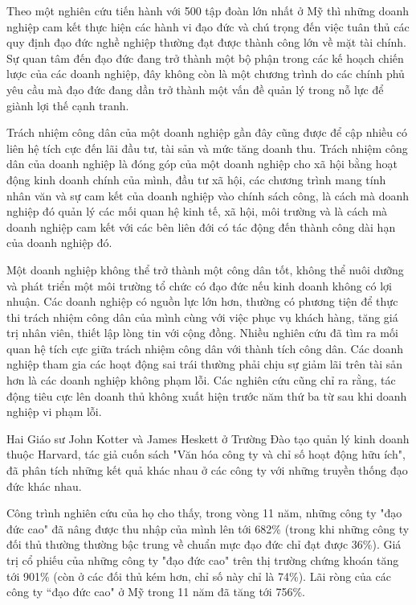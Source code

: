\documentclass{article}
\begin{document}
\begin{itemize}
                \qquad Theo một nghiên cứu tiến hành với 500 tập đoàn lớn nhất ở Mỹ thì những doanh nghiệp cam kết thực hiện các hành vi đạo đức và chú trọng đến việc tuân thủ các quy định đạo đức nghề nghiệp thường đạt được thành công lớn về mặt tài chính. Sự quan tâm đến đạo đức đang trở thành một bộ phận trong các kế hoạch chiến lược của các doanh nghiệp, đây không còn là một chương trình do các chính phủ yêu cầu mà đạo đức đang dần trở thành một vấn đề quản lý trong nỗ lực để giành lợi thế cạnh tranh.

                \qquad Trách nhiệm công dân của một doanh nghiệp gần đây cũng được để cập nhiều có liên hệ tích cực đến lãi đầu tư, tài sản và mức tăng doanh thu. Trách nhiệm công dân của doanh nghiệp là đóng góp của một doanh nghiệp cho xã hội bằng hoạt động kinh doanh chính của mình, đầu tư xã hội, các chương trình mang tính nhân văn và sự cam kết của doanh nghiệp vào chính sách công, là cách mà doanh nghiệp đó quản lý các mối quan hệ kinh tế, xã hội, môi trường và là cách mà doanh nghiệp cam kết với các bên liên đới có tác động đến thành công dài hạn của doanh nghiệp đó.

                \qquad Một doanh nghiệp không thể trở thành một công dân tốt, không thể nuôi dưỡng và phát triển một môi trường tổ chức có đạo đức nếu kinh doanh không có lợi nhuận. Các doanh nghiệp có nguồn lực lớn hơn, thường có phương tiện để thực thi trách nhiệm công dân của mình cùng với việc phục vụ khách hàng, tăng giá trị nhân viên, thiết lập lòng tin với cộng đồng. Nhiều nghiên cứu đã tìm ra mối quan hệ tích cực giữa trách nhiệm công dân với thành tích công dân. Các doanh nghiệp tham gia các hoạt động sai trái thường phải chịu sự giảm lãi trên tài sån hơn là các doanh nghiệp không phạm lỗi. Các nghiên cứu cũng chỉ ra rằng, tác động tiêu cực lên doanh thủ không xuất hiện trước năm thứ ba từ sau khi doanh nghiệp vi phạm lỗi.

                \qquad Hai Giáo sư John Kotter và James Heskett ở Trường Đào tạo quản lý kinh doanh thuộc Harvard, tác giả cuốn sách "Văn hóa công ty và chỉ số hoạt động hữu ích", đã phân tích những kết quả khác nhau ở các công ty với những truyền thống đạo đức khác nhau.

                \qquad Công trình nghiên cứu của họ cho thấy, trong vòng 11 năm, những công ty "đạo đức cao" đã nâng được thu nhập của mình lên tới 682\% (trong khi những công ty đối thủ thường thường bậc trung về chuẩn mực đạo đức chỉ đạt được 36\%). Giá trị cổ phiếu của những công ty "đạo đức cao" trên thị trường chứng khoán tăng tới 901\% (còn ở các đối thủ kém hơn, chỉ số này chỉ là 74\%). Lãi ròng của các công ty “đạo đức cao" ở Mỹ trong 11 năm đã tăng tới 756\%.


\end{itemize}
\end{document}
